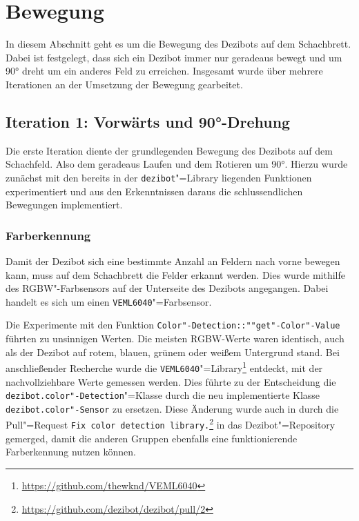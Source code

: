 
\section{Bewegung}
\label{sec:movement}

In diesem Abschnitt geht es um die Bewegung des Dezibots auf dem Schachbrett. Dabei ist festgelegt, dass sich ein Dezibot immer nur geradeaus bewegt und um 90° dreht um ein anderes Feld zu erreichen. Insgesamt wurde über mehrere Iterationen an der Umsetzung der Bewegung gearbeitet.


\subsection{Iteration 1: Vorwärts und 90°-Drehung}
\label{sec:move-straight-turn}

Die erste Iteration diente der grundlegenden Bewegung des Dezibots auf dem Schachfeld. Also dem geradeaus Laufen und dem Rotieren um 90°. Hierzu wurde zunächst mit den bereits in der \texttt{dezibot}"=Library liegenden Funktionen experimentiert und aus den Erkenntnissen daraus die schlussendlichen Bewegungen implementiert. 

\subsubsection{Farberkennung}
\label{sec:color-detection}

Damit der Dezibot sich eine bestimmte Anzahl an Feldern nach vorne bewegen kann, muss auf dem Schachbrett die Felder erkannt werden. Dies wurde mithilfe des RGBW"-Farbsensors auf der Unterseite des Dezibots angegangen. Dabei handelt es sich um einen \texttt{VEML6040}"=Farbsensor.

Die Experimente mit den Funktion \texttt{Color"-Detection::""get"-Color"-Value} führten zu unsinnigen Werten. Die meisten RGBW-Werte waren identisch, auch als der Dezibot auf rotem, blauen, grünem oder weißem Untergrund stand. Bei anschließender Recherche wurde die \texttt{VEML6040}"=Library\footnote{\url{https://github.com/thewknd/VEML6040}} entdeckt, mit der nachvollziehbare Werte gemessen werden. Dies führte zu der Entscheidung die \texttt{dezibot.color"-Detection}"=Klasse durch die neu implementierte Klasse \texttt{dezibot.color"-Sensor} zu ersetzen. Diese Änderung wurde auch in durch die Pull"=Request \texttt{Fix color detection library.}\footnote{\url{https://github.com/dezibot/dezibot/pull/2}} in das Dezibot"=Repository gemerged, damit die anderen Gruppen ebenfalls eine funktionierende Farberkennung nutzen können.

